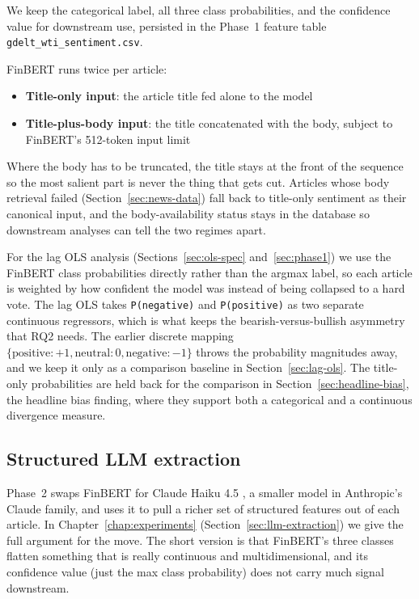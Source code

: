 We keep the categorical label, all three class probabilities, and the confidence value for downstream use, persisted in the Phase~1 feature table \texttt{gdelt\_wti\_sentiment.csv}.

FinBERT runs twice per article:

\begin{itemize}
  \item \textbf{Title-only input}: the article title fed alone to the model
  \item \textbf{Title-plus-body input}: the title concatenated with the body, subject to FinBERT's 512-token input limit
\end{itemize}

Where the body has to be truncated, the title stays at the front of the sequence so the most salient part is never the thing that gets cut. Articles whose body retrieval failed (Section~\ref{sec:news-data}) fall back to title-only sentiment as their canonical input, and the body-availability status stays in the database so downstream analyses can tell the two regimes apart.

For the lag OLS analysis (Sections~\ref{sec:ols-spec} and~\ref{sec:phase1}) we use the FinBERT class probabilities directly rather than the argmax label, so each article is weighted by how confident the model was instead of being collapsed to a hard vote. The lag OLS takes \texttt{P(negative)} and \texttt{P(positive)} as two separate continuous regressors, which is what keeps the bearish-versus-bullish asymmetry that RQ2 needs. The earlier discrete mapping $\{\text{positive}: +1, \text{neutral}: 0, \text{negative}: -1\}$ throws the probability magnitudes away, and we keep it only as a comparison baseline in Section~\ref{sec:lag-ols}. The title-only probabilities are held back for the comparison in Section~\ref{sec:headline-bias}, the headline bias finding, where they support both a categorical and a continuous divergence measure.

\subsection{Structured LLM extraction}\label{sec:schema}

Phase~2 swaps FinBERT for Claude Haiku 4.5 \citep{anthropic_claude}, a smaller model in Anthropic's Claude family, and uses it to pull a richer set of structured features out of each article. In Chapter~\ref{chap:experiments} (Section~\ref{sec:llm-extraction}) we give the full argument for the move. The short version is that FinBERT's three classes flatten something that is really continuous and multidimensional, and its confidence value (just the max class probability) does not carry much signal downstream.

